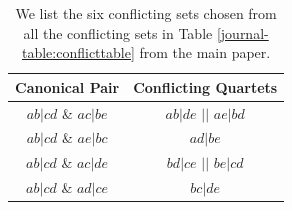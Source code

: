 \documentclass[10pt,a4paper]{article}
\begin{document}
\begin{table}[h!]
\caption{We list the six conflicting sets chosen from all the conflicting sets in Table \ref{journal-table:conflicttable} from the main paper.}
    \centering
     \renewcommand{\arraystretch}{1.2}
    \begin{tabular}{|c|c|}
        \hline
        \textbf{Canonical Pair} & \textbf{Conflicting Quartets} \\ \hline

        $ab|cd$ \& $ac|be$ 
        & $ab|de$ $||$ $ae|bd$\\ \hline

        $ab|cd$ \& $ae|bc$ 
        & $ad|be$\\ \hline

        $ab|cd$ \& $ac|de$ 
        & $bd|ce$ $||$ $be|cd$\\ \hline

        $ab|cd$ \& $ad|ce$ 
        & $bc|de$\\ \hline
        
    \end{tabular}
    \label{table:conflicttable_six}
\end{table}





\end{document}
